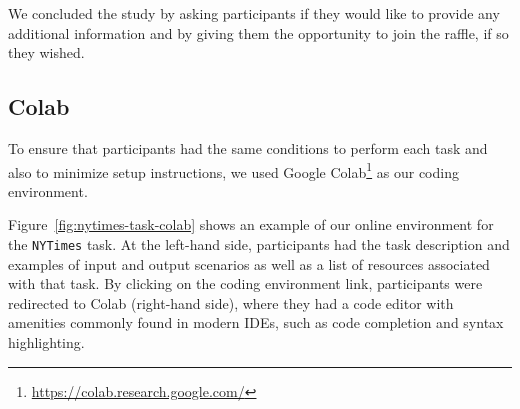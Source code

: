 We concluded the study by asking participants if they would like to provide any additional information and 
by giving them the opportunity to join the raffle, if so they wished. 











\subsection{Colab}
\label{cp6:environment}


To ensure that participants had the same conditions to perform each task
and also to minimize setup instructions, we used Google Colab\footnote{\url{https://colab.research.google.com/}} as our coding environment. 



Figure~\ref{fig:nytimes-task-colab} shows an example of our online environment for the \texttt{NYTimes} task.
At the left-hand side, participants had the task description and examples of input and output scenarios as well as a list of resources associated with that task. 
By clicking on the coding environment link, participants were redirected to Colab (right-hand side),
where they had a code editor with amenities commonly found in modern IDEs, such as code completion and syntax highlighting. 




